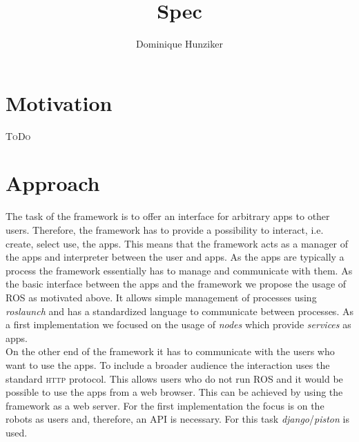 \documentclass[10pt,a4paper]{article}
\title {Spec}
\author {Dominique Hunziker}
\begin{document}
	\section*{Motivation}
		\textsc{ToDo}
	
	\section*{Approach}
		The task of the framework is to offer an interface for arbitrary apps to other users.
		Therefore, the framework has to provide a possibility to interact, i.e. create, select
		use, the apps. This means that the framework acts as a manager of the apps and interpreter
		between the user and apps. As the apps are typically a process the framework essentially
		has to manage and communicate with them. As the basic interface between the apps and the
		framework we propose the usage of \textsc{ROS} as motivated above. It allows simple management
		of processes using \emph{roslaunch} and has a standardized language to communicate between
		processes. As a first implementation we focused on the usage of \emph{nodes} which provide
		\emph{services} as apps. \\
		On the other end of the framework it has to communicate with the users who want to use the
		apps. To include a broader audience the interaction uses the standard \textsc{http} protocol.
		This allows users who do not run \textsc{ROS} and it would be possible to use the apps from
		a web browser. This can be achieved by using the framework as a web server. For the first
		implementation the focus is on the robots as users and, therefore, an API is necessary. For
		this task \emph{django}/\emph{piston} is used.
	
\end{document}

